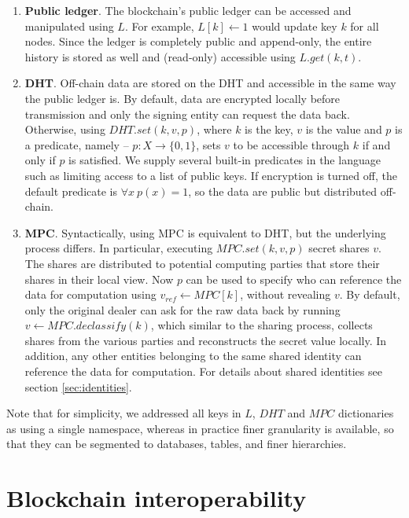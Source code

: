 \documentclass{article} \usepackage{nips13submit_e,times}
\begin{document}
\begin{enumerate}
	\item \textbf{Public ledger}. The blockchain's public ledger can be accessed and manipulated using $L$. For example, $L[k] \gets 1$ would update key $k$ for all nodes. Since the ledger is completely public and append-only, the entire history is stored as well and (read-only) accessible using $L.get(k,t)$.
	
	\item \textbf{DHT}. Off-chain data are stored on the DHT and accessible in the same way the public ledger is. By default, data are encrypted locally before transmission and only the signing entity can request the data back. Otherwise, using $DHT.set(k,v,p)$, where $k$ is the key, $v$ is the value and $p$ is a predicate, namely -- $p: X \rightarrow \{ 0, 1 \}$, sets $v$ to be accessible through $k$ if and only if $p$ is satisfied. We supply several built-in predicates in the language such as limiting access to a list of public keys. If encryption is turned off, the default predicate is $\forall x\ p(x) = 1$, so the data are public but distributed off-chain.
	
	\item \textbf{MPC}. Syntactically, using MPC is equivalent to DHT, but the underlying process differs. In particular, executing $MPC.set(k,v,p)$ secret shares $v$. The shares are distributed to potential computing parties that store their shares in their local view. Now $p$ can be used to specify who can reference the data for computation using $v_{ref} \gets MPC[k]$, without revealing $v$. By default, only the original dealer can ask for the raw data back by running $v \gets MPC.declassify(k)$, which similar to the sharing process, collects shares from the various parties and reconstructs the secret value locally. In addition, any other entities belonging to the same shared identity can reference the data for computation. For details about shared identities see section \ref{sec:identities}.
\end{enumerate}

Note that for simplicity, we addressed all keys in $L$, $DHT$ and $MPC$ dictionaries as using a single namespace, whereas in practice finer granularity is available, so that they can be segmented to databases, tables, and finer hierarchies. 










\section{Blockchain interoperability}
\end{document}
